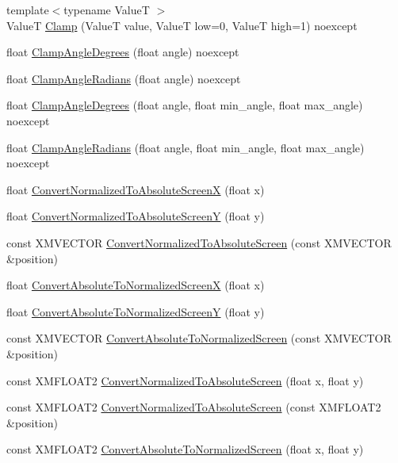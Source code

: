 \begin{DoxyCompactItemize}
\item 
{\footnotesize template$<$typename ValueT $>$ }\\ValueT \hyperlink{namespacemage_a5cfa036b7efd127e1d501677c40895ee}{Clamp} (ValueT value, ValueT low=0, ValueT high=1) noexcept
\item 
float \hyperlink{namespacemage_ad88ee430e619da3733c76dffc6d64f33}{Clamp\+Angle\+Degrees} (float angle) noexcept
\item 
float \hyperlink{namespacemage_a24f9402a4169f749b0a6a81565e3912b}{Clamp\+Angle\+Radians} (float angle) noexcept
\item 
float \hyperlink{namespacemage_a1e025136183f15dfee13b125bdbc0655}{Clamp\+Angle\+Degrees} (float angle, float min\+\_\+angle, float max\+\_\+angle) noexcept
\item 
float \hyperlink{namespacemage_a9a1a0e1446f6c81d71fdb9480fdac38d}{Clamp\+Angle\+Radians} (float angle, float min\+\_\+angle, float max\+\_\+angle) noexcept
\item 
float \hyperlink{namespacemage_a2dbd3992e0bcb94b465ab4ab6b7d7f83}{Convert\+Normalized\+To\+Absolute\+ScreenX} (float x)
\item 
float \hyperlink{namespacemage_abc0e5fd9efdcd160a7c4e9b14c8ec7b6}{Convert\+Normalized\+To\+Absolute\+ScreenY} (float y)
\item 
const X\+M\+V\+E\+C\+T\+OR \hyperlink{namespacemage_a37cd57f31a66aac5355061bc3ad4e5ec}{Convert\+Normalized\+To\+Absolute\+Screen} (const X\+M\+V\+E\+C\+T\+OR \&position)
\item 
float \hyperlink{namespacemage_a7ad05dbf5e2b5d625daf57f43b26217f}{Convert\+Absolute\+To\+Normalized\+ScreenX} (float x)
\item 
float \hyperlink{namespacemage_a4300e91e448d76e1015cbc806c1d4467}{Convert\+Absolute\+To\+Normalized\+ScreenY} (float y)
\item 
const X\+M\+V\+E\+C\+T\+OR \hyperlink{namespacemage_add9fc09b8a7166c5e0d0bde63d8f2747}{Convert\+Absolute\+To\+Normalized\+Screen} (const X\+M\+V\+E\+C\+T\+OR \&position)
\item 
const X\+M\+F\+L\+O\+A\+T2 \hyperlink{namespacemage_a34b18c1eb8d1e94675b10c86845e2564}{Convert\+Normalized\+To\+Absolute\+Screen} (float x, float y)
\item 
const X\+M\+F\+L\+O\+A\+T2 \hyperlink{namespacemage_aec1ce8ea913d981f727765f39f79d5e3}{Convert\+Normalized\+To\+Absolute\+Screen} (const X\+M\+F\+L\+O\+A\+T2 \&position)
\item 
const X\+M\+F\+L\+O\+A\+T2 \hyperlink{namespacemage_a98a82c6ca513d50f16d4ee6256fdac29}{Convert\+Absolute\+To\+Normalized\+Screen} (float x, float y)

\end{DoxyCompactItemize}
